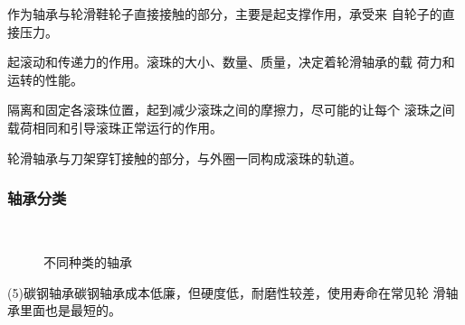 \documentclass[12pt]{ctexart}
\begin{document}
作为轴承与轮滑鞋轮子直接接触的部分，主要是起支撑作用，承受来
自轮子的直接压力。

起滚动和传递力的作用。滚珠的大小、数量、质量，决定着轮滑轴承的载
荷力和运转的性能。

隔离和固定各滚珠位置，起到减少滚珠之间的摩擦力，尽可能的让每个
滚珠之间载荷相同和引导滚珠正常运行的作用。

轮滑轴承与刀架穿钉接触的部分，与外圈一同构成滚珠的轨道。

\subsubsection{轴承分类}
\begin{figure}[tb]
  \centering
  \\
  \caption{不同种类的轴承\cite{zhihu:migao}}
\end{figure}

\bsctype(5){碳钢轴承}碳钢轴承成本低廉，但硬度低，耐磨性较差，使用寿命在常见轮
滑轴承里面也是最短的。
\end{document}
